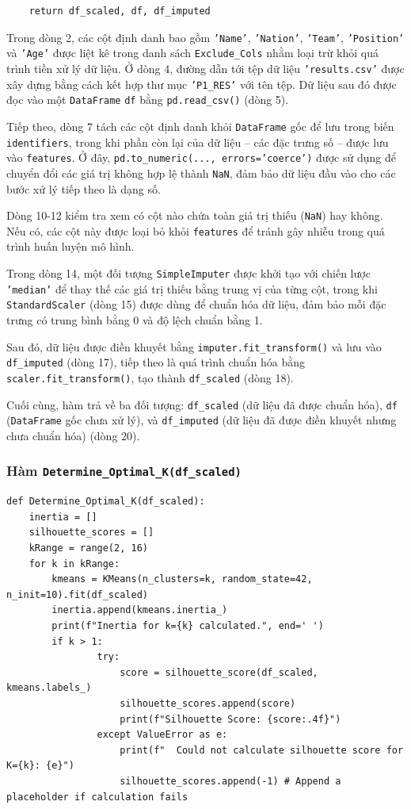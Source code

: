 \documentclass[12pt]{report}
\begin{document}
{\begin{lstlisting}
    return df_scaled, df, df_imputed
\end{lstlisting}
Trong dòng 2, các cột định danh bao gồm \texttt{'Name'}, \texttt{'Nation'}, \texttt{'Team'}, \texttt{'Position'} và \texttt{'Age'} được liệt kê trong danh sách \texttt{Exclude\_Cols} nhằm loại trừ khỏi quá trình tiền xử lý dữ liệu. Ở dòng 4, đường dẫn tới tệp dữ liệu \texttt{'results.csv'} được xây dựng bằng cách kết hợp thư mục \texttt{'P1\_RES'} với tên tệp. Dữ liệu sau đó được đọc vào một \texttt{DataFrame} \texttt{df} bằng \texttt{pd.read\_csv()} (dòng 5).

Tiếp theo, dòng 7 tách các cột định danh khỏi \texttt{DataFrame} gốc để lưu trong biến \texttt{identifiers}, trong khi phần còn lại của dữ liệu – các đặc trưng số – được lưu vào \texttt{features}. Ở đây, \texttt{pd.to\_numeric(..., errors='coerce')} được sử dụng để chuyển đổi các giá trị không hợp lệ thành \texttt{NaN}, đảm bảo dữ liệu đầu vào cho các bước xử lý tiếp theo là dạng số.

Dòng 10-12 kiểm tra xem có cột nào chứa toàn giá trị thiếu (\texttt{NaN}) hay không. Nếu có, các cột này được loại bỏ khỏi \texttt{features} để tránh gây nhiễu trong quá trình huấn luyện mô hình.

Trong dòng 14, một đối tượng \texttt{SimpleImputer} được khởi tạo với chiến lược \texttt{'median'} để thay thế các giá trị thiếu bằng trung vị của từng cột, trong khi \texttt{StandardScaler} (dòng 15) được dùng để chuẩn hóa dữ liệu, đảm bảo mỗi đặc trưng có trung bình bằng 0 và độ lệch chuẩn bằng 1.

Sau đó, dữ liệu được điền khuyết bằng \texttt{imputer.fit\_transform()} và lưu vào \texttt{df\_imputed} (dòng 17), tiếp theo là quá trình chuẩn hóa bằng \texttt{scaler.fit\_transform()}, tạo thành \texttt{df\_scaled} (dòng 18).

Cuối cùng, hàm trả về ba đối tượng: \texttt{df\_scaled} (dữ liệu đã được chuẩn hóa), \texttt{df} (\texttt{DataFrame} gốc chưa xử lý), và \texttt{df\_imputed} (dữ liệu đã được điền khuyết nhưng chưa chuẩn hóa) (dòng 20).
\subsubsection{Hàm \texttt{Determine\_Optimal\_K(df\_scaled)}}
\begin{lstlisting}
def Determine_Optimal_K(df_scaled):
    inertia = []
    silhouette_scores = []
    kRange = range(2, 16)
    for k in kRange:
        kmeans = KMeans(n_clusters=k, random_state=42, n_init=10).fit(df_scaled)
        inertia.append(kmeans.inertia_)
        print(f"Inertia for k={k} calculated.", end=' ')
        if k > 1:
                try:
                    score = silhouette_score(df_scaled, kmeans.labels_)
                    silhouette_scores.append(score)
                    print(f"Silhouette Score: {score:.4f}")
                except ValueError as e:
                    print(f"  Could not calculate silhouette score for K={k}: {e}")
                    silhouette_scores.append(-1) # Append a placeholder if calculation fails


\end{lstlisting}}
\end{document}
